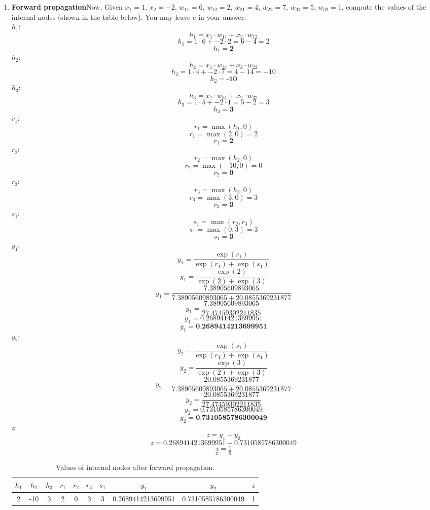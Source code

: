 \documentclass[a3paper,12pt]{extarticle} %
\begin{document}
\begin{enumerate}
\begin{figure}[h]
    \label{fig:primal}
\end{figure}
\begin{enumerate}
    \item \textbf{Forward propagation}Now,  Given $x_1 = 1$, $x_2 = -2$, $w_{11} = 6$, $w_{12} = 2$, $w_{21} = 4$, $w_{22} = 7$, $w_{31} = 5$, $w_{32} = 1$, compute the values of the internal nodes (shown in the table below). You may leave $e$ in your answer.
    \\ $h_1:$
    \[
    h_1 = x_1 \cdot w_{11} + x_2 \cdot w_{12}
    \]
    \[
    h_1 = 1 \cdot 6 + -2 \cdot 2 = 6 - 4 = 2
    \]
    \[
    h_1 = \textbf{2}
    \]
    $h_2:$
    \[
    h_2 = x_1 \cdot w_{21} + x_2 \cdot w_{22}
    \]
    \[
    h_2 = 1 \cdot 4 + -2 \cdot 7 = 4 - 14 = -10
    \]
    \[
    h_2 = \textbf{-10}
    \]
    $h_3:$
    \[
    h_3 = x_1 \cdot w_{31} + x_2 \cdot w_{32}
    \]
    \[
    h_3 = 1 \cdot 5 + -2 \cdot 1 = 5 - 2 = 3
    \]
    \[
    h_3 = \textbf{3}
    \]
    $r_1:$
    \[
    r_1 = \max(h_1, 0)
    \]
    \[
    r_1 = \max(2, 0) = 2
    \]
    \[
    r_1 = \textbf{2}
    \]
    $r_2:$
    \[
    r_2 = \max(h_2, 0)
    \]
    \[
    r_2 = \max(-10, 0) = 0
    \]
    \[
    r_2 = \textbf{0}
    \]
    $r_3:$
    \[
    r_3 = \max(h_3, 0)
    \]
    \[
    r_3 = \max(3, 0) = 3
    \]
    \[
    r_3 = \textbf{3}
    \]
    $s_1:$
    \[
    s_1 = \max(r_2, r_3)
    \]
    \[
    s_1 = \max(0, 3) = 3
    \]
    \[
    s_1 = \textbf{3}
    \]
    $y_1:$
    \[
    y_1 = \frac{\exp(r_1)}{\exp(r_1) + \exp(s_1)}
    \]
    \[
    y_1 = \frac{\exp(2)}{\exp(2) + \exp(3)}
    \]
    \[
    y_1 = \frac{7.38905609893065}{7.38905609893065 + 20.0855369231877}
    \]
    \[
    y_1 = \frac{7.38905609893065}{27.47459302211835}
    \]
    \[
    y_1 = 0.2689414213699951
    \]
    \[
    y_1 = \textbf{0.2689414213699951}
    \]
    $y_2:$
    \[
    y_2 = \frac{\exp(s_1)}{\exp(r_1) + \exp(s_1)}
    \]
    \[
    y_2 = \frac{\exp(3)}{\exp(2) + \exp(3)}
    \]
    \[
    y_2 = \frac{20.0855369231877}{7.38905609893065 + 20.0855369231877}
    \]
    \[
    y_2 = \frac{20.0855369231877}{27.47459302211835}
    \]
    \[
    y_2 = 0.7310585786300049
    \]
    \[
    y_2 = \textbf{0.7310585786300049}
    \]
    $z:$
    \[
    z = y_1 + y_2
    \]
    \[
    z = 0.2689414213699951 + 0.7310585786300049
    \]
    \[
    z = 1
    \]
    \[
    z = \textbf{1}
    \]

\begin{table}[h!]
\centering
\begin{tabular}{|c|c|c|c|c|c|c|c|c|c|}
\hline
$h_1$ & $h_2$ & $h_3$ & $r_1$ & $r_2$ & $r_3$ & $s_1$ & $y_1$ & $y_2$ & $z$ \\ \hline
2 & -10 & 3 & 2 & 0 & 3 & 3 & 0.2689414213699951 & 0.7310585786300049 & 1 \\ \hline
\end{tabular}
\caption{Values of internal nodes after forward propagation.}
\label{table:forward}
\end{table}


\end{enumerate}
\end{enumerate}
\end{document}
